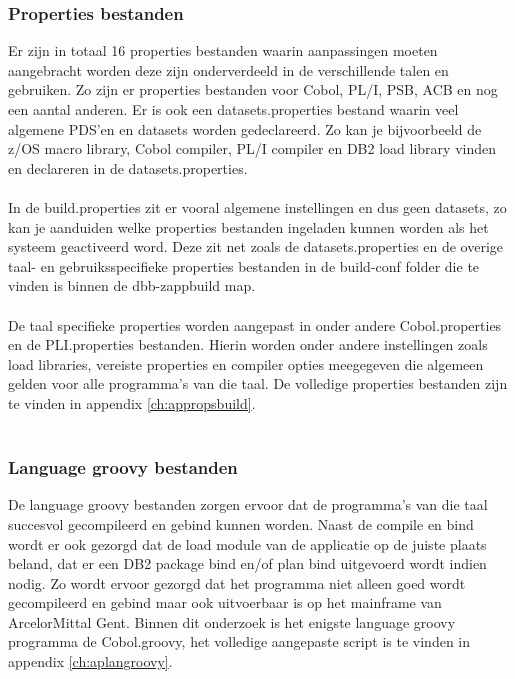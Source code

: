 \subsubsection{Properties bestanden}
Er zijn in totaal 16 properties bestanden waarin aanpassingen moeten aangebracht worden deze zijn onderverdeeld in de verschillende talen en gebruiken. Zo zijn er properties bestanden voor Cobol, PL/I, PSB, ACB en nog een aantal anderen. Er is ook een datasets.properties bestand waarin veel algemene PDS'en en datasets worden gedeclareerd. Zo kan je bijvoorbeeld de z/OS macro library, Cobol compiler, PL/I compiler en DB2 load library vinden en declareren in de datasets.properties. 
\\ \\
In de build.properties zit er vooral algemene instellingen en dus geen datasets, zo kan je aanduiden welke properties bestanden ingeladen kunnen worden als het systeem geactiveerd word. Deze zit net zoals de datasets.properties en de overige taal- en gebruiksspecifieke properties bestanden in de build-conf folder die te vinden is binnen de dbb-zappbuild map. 
\\ \\
De taal specifieke properties worden aangepast in onder andere Cobol.properties en de PLI.properties bestanden. Hierin worden onder andere instellingen zoals load libraries, vereiste properties en compiler opties meegegeven die algemeen gelden voor alle programma's van die taal. De volledige properties bestanden zijn te vinden in appendix \ref{ch:appropsbuild}.
\\ \\
\subsubsection{Language groovy bestanden}
De language groovy bestanden zorgen ervoor dat de programma's van die taal succesvol gecompileerd en gebind kunnen worden. Naast de compile en bind wordt er ook gezorgd dat de load module van de applicatie op de juiste plaats beland, dat er een DB2 package bind en/of plan bind uitgevoerd wordt indien nodig. Zo wordt ervoor gezorgd dat het programma niet alleen goed wordt gecompileerd en gebind maar ook uitvoerbaar is op het mainframe van ArcelorMittal Gent. Binnen dit onderzoek is het enigste language groovy programma de Cobol.groovy, het volledige aangepaste script is te vinden in appendix \ref{ch:aplangroovy}.
\\ \\
